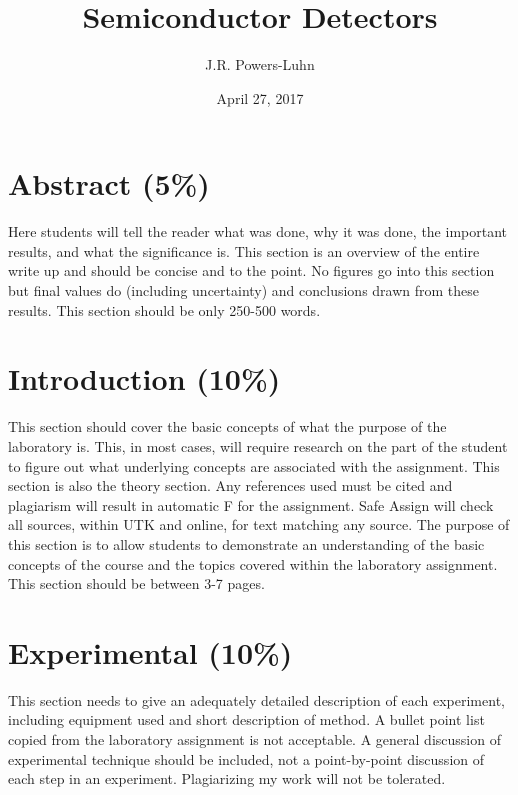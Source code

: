 \documentclass[12pt]{article}
\title{Semiconductor Detectors}
\author{J.R. Powers-Luhn}
\date{April 27, 2017}
\begin{document}

\maketitle

\section{Abstract (5\%)}
Here students will tell the reader what was done, why it was done, the important results, and what the significance is. This section is an overview of the entire write up and should be concise and to the point. No figures go into this section but final values do (including uncertainty) and conclusions drawn from these results. This section should be only 250-500 words.

\section{Introduction (10\%)}
This section should cover the basic concepts of what the purpose of the laboratory is. This, in most cases, will require research on the part of the student to figure out what underlying concepts are associated with the assignment. This section is also the theory section. Any references used must be cited and plagiarism will result in automatic F for the assignment. Safe Assign will check all sources, within UTK and online, for text matching any source. The purpose of this section is to allow students to demonstrate an understanding of the basic concepts of the course and the topics covered within the laboratory assignment. This section should be between 3-7 pages.

\section{Experimental (10\%)}
This section needs to give an adequately detailed description of each experiment, including equipment used and short description of method. A bullet point list copied from the laboratory assignment is not acceptable. A general discussion of experimental technique should be included, not a point-by-point discussion of each step in an experiment. Plagiarizing my work will not be tolerated. 
\end{document}
